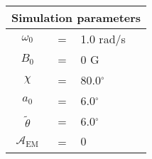\begin{tabular}{ccl}
\multicolumn{3}{c}{Simulation parameters} \\
\hline
$\omega_0$  &=& 1.0 rad/s\\
$B_0$  &=& $0$ G \\
$\chi$  &=& 80.0$^{\circ}$ \\
$a_0$ &=& 6.0$^{\circ}$ \\
$\tilde{\theta}$ &= & 6.0$^{\circ}$ \\
$\mathcal{A}_{\mathrm{EM}}$ &= & $0$
\end{tabular}
